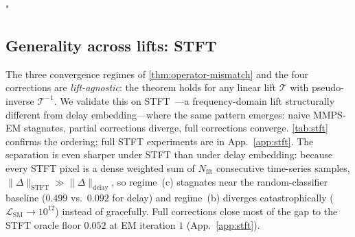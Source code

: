 "\documentclass{article}
\theoremstyle{plain}
\theoremstyle{definition}
\theoremstyle{remark}
\newcommand{\tsimg}{\mathcal{T}}
\newcommand{\imgts}{\mathcal{T}^{-1}}
\begin{document}
\vspace{-1mm}
\subsection{Generality across lifts: STFT}
\label{sec:stft-generality}
\vspace{-1mm}

The three convergence regimes of \cref{thm:operator-mismatch} and the four corrections are \emph{lift-agnostic}: the theorem holds for any linear lift $\tsimg$ with pseudo-inverse $\imgts$. We validate this on STFT~\citep{griffin1984signal}---a frequency-domain lift structurally different from delay embedding---where the same pattern emerges: naive MMPS-EM stagnates, partial corrections diverge, full corrections converge. \cref{tab:stft} confirms the ordering; full STFT experiments are in App.~\ref{app:stft}. The separation is even sharper under STFT than under delay embedding: because every STFT pixel is a dense weighted sum of $N_{\mathrm{fft}}$ consecutive time-series samples, $\|\Delta\|_{\mathrm{STFT}} \gg \|\Delta\|_{\mathrm{delay}}$, so regime~(c) stagnates near the random-classifier baseline ($0.499$ vs.\ $0.092$ for delay) and regime~(b) diverges catastrophically ($\mathcal{L}_{\mathrm{SM}}\!\to\!10^{12}$) instead of gracefully. Full corrections close most of the gap to the STFT oracle floor $0.052$ at EM iteration $1$ (App.~\ref{app:stft}).

\begin{table}[h]
\centering
\caption{Generality across lifts: disc.\ score ($\downarrow$) on ETTh1 ($L{=}24$), $50\%$ missing, with STFT as the lift (n\_fft${=}8$, hop${=}4$). The three-regime pattern matches delay embedding, with a strictly larger separation (see text). Full STFT trajectory in App.~\ref{app:stft}.}
\label{tab:stft}
\vspace{-1mm}
\end{table}
\end{document}
